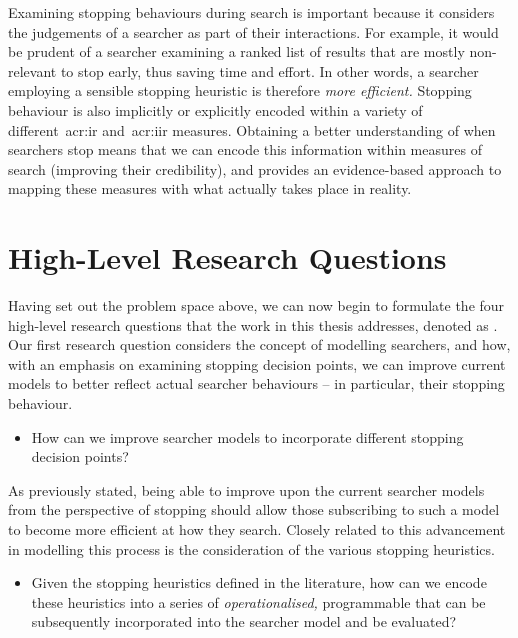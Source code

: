 Examining stopping behaviours during search is important because it considers the judgements of a searcher as part of their interactions. For example, it would be prudent of a searcher examining a ranked list of results that are mostly non-relevant to stop early, thus saving time and effort. In other words, a searcher employing a sensible stopping heuristic is therefore \emph{more efficient.} Stopping behaviour is also implicitly or explicitly encoded within a variety of different~\gls{acr:ir} and~\gls{acr:iir} measures. Obtaining a better understanding of when searchers stop means that we can encode this information within measures of search (improving their credibility), and provides an evidence-based approach to mapping these measures with what actually takes place in reality.

\section{High-Level Research Questions}\label{sec:intro:rqs}
Having set out the problem space above, we can now begin to formulate the four high-level research questions that the work in this thesis addresses, denoted as . Our first research question considers the concept of modelling searchers, and how, with an emphasis on examining stopping decision points, we can improve current models to better reflect actual searcher behaviours -- in particular, their stopping behaviour.

\begin{itemize}
    \item[]{ How can we improve searcher models to incorporate different stopping decision points?}
\end{itemize}

As previously stated, being able to improve upon the current searcher models from the perspective of stopping should allow those subscribing to such a model to become more efficient at how they search. Closely related to this advancement in modelling this process is the consideration of the various stopping heuristics.

\begin{itemize}
    \item[]{ Given the stopping heuristics defined in the literature, how can we encode these heuristics into a series of \emph{operationalised,} programmable  that can be subsequently incorporated into the searcher model and be evaluated?}
\end{itemize}

